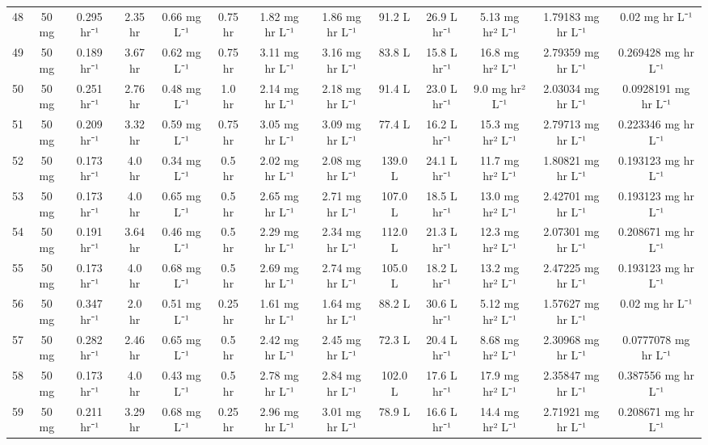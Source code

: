 \documentclass[12pt,a4paper]{article}
\begin{document}
\begin{tabular}{r|cccccccccccc}
	48 & 50 mg & 0.295 hr⁻¹ & 2.35 hr & 0.66 mg L⁻¹ & 0.75 hr & 1.82 mg hr L⁻¹ & 1.86 mg hr L⁻¹ & 91.2 L & 26.9 L hr⁻¹ & 5.13 mg hr² L⁻¹ & 1.79183 mg hr L⁻¹ & 0.02 mg hr L⁻¹ \\
	49 & 50 mg & 0.189 hr⁻¹ & 3.67 hr & 0.62 mg L⁻¹ & 0.75 hr & 3.11 mg hr L⁻¹ & 3.16 mg hr L⁻¹ & 83.8 L & 15.8 L hr⁻¹ & 16.8 mg hr² L⁻¹ & 2.79359 mg hr L⁻¹ & 0.269428 mg hr L⁻¹ \\
	50 & 50 mg & 0.251 hr⁻¹ & 2.76 hr & 0.48 mg L⁻¹ & 1.0 hr & 2.14 mg hr L⁻¹ & 2.18 mg hr L⁻¹ & 91.4 L & 23.0 L hr⁻¹ & 9.0 mg hr² L⁻¹ & 2.03034 mg hr L⁻¹ & 0.0928191 mg hr L⁻¹ \\
	51 & 50 mg & 0.209 hr⁻¹ & 3.32 hr & 0.59 mg L⁻¹ & 0.75 hr & 3.05 mg hr L⁻¹ & 3.09 mg hr L⁻¹ & 77.4 L & 16.2 L hr⁻¹ & 15.3 mg hr² L⁻¹ & 2.79713 mg hr L⁻¹ & 0.223346 mg hr L⁻¹ \\
	52 & 50 mg & 0.173 hr⁻¹ & 4.0 hr & 0.34 mg L⁻¹ & 0.5 hr & 2.02 mg hr L⁻¹ & 2.08 mg hr L⁻¹ & 139.0 L & 24.1 L hr⁻¹ & 11.7 mg hr² L⁻¹ & 1.80821 mg hr L⁻¹ & 0.193123 mg hr L⁻¹ \\
	53 & 50 mg & 0.173 hr⁻¹ & 4.0 hr & 0.65 mg L⁻¹ & 0.5 hr & 2.65 mg hr L⁻¹ & 2.71 mg hr L⁻¹ & 107.0 L & 18.5 L hr⁻¹ & 13.0 mg hr² L⁻¹ & 2.42701 mg hr L⁻¹ & 0.193123 mg hr L⁻¹ \\
	54 & 50 mg & 0.191 hr⁻¹ & 3.64 hr & 0.46 mg L⁻¹ & 0.5 hr & 2.29 mg hr L⁻¹ & 2.34 mg hr L⁻¹ & 112.0 L & 21.3 L hr⁻¹ & 12.3 mg hr² L⁻¹ & 2.07301 mg hr L⁻¹ & 0.208671 mg hr L⁻¹ \\
	55 & 50 mg & 0.173 hr⁻¹ & 4.0 hr & 0.68 mg L⁻¹ & 0.5 hr & 2.69 mg hr L⁻¹ & 2.74 mg hr L⁻¹ & 105.0 L & 18.2 L hr⁻¹ & 13.2 mg hr² L⁻¹ & 2.47225 mg hr L⁻¹ & 0.193123 mg hr L⁻¹ \\
	56 & 50 mg & 0.347 hr⁻¹ & 2.0 hr & 0.51 mg L⁻¹ & 0.25 hr & 1.61 mg hr L⁻¹ & 1.64 mg hr L⁻¹ & 88.2 L & 30.6 L hr⁻¹ & 5.12 mg hr² L⁻¹ & 1.57627 mg hr L⁻¹ & 0.02 mg hr L⁻¹ \\
	57 & 50 mg & 0.282 hr⁻¹ & 2.46 hr & 0.65 mg L⁻¹ & 0.5 hr & 2.42 mg hr L⁻¹ & 2.45 mg hr L⁻¹ & 72.3 L & 20.4 L hr⁻¹ & 8.68 mg hr² L⁻¹ & 2.30968 mg hr L⁻¹ & 0.0777078 mg hr L⁻¹ \\
	58 & 50 mg & 0.173 hr⁻¹ & 4.0 hr & 0.43 mg L⁻¹ & 0.5 hr & 2.78 mg hr L⁻¹ & 2.84 mg hr L⁻¹ & 102.0 L & 17.6 L hr⁻¹ & 17.9 mg hr² L⁻¹ & 2.35847 mg hr L⁻¹ & 0.387556 mg hr L⁻¹ \\
	59 & 50 mg & 0.211 hr⁻¹ & 3.29 hr & 0.68 mg L⁻¹ & 0.25 hr & 2.96 mg hr L⁻¹ & 3.01 mg hr L⁻¹ & 78.9 L & 16.6 L hr⁻¹ & 14.4 mg hr² L⁻¹ & 2.71921 mg hr L⁻¹ & 0.208671 mg hr L⁻¹ \\

\end{tabular}
\end{document}

